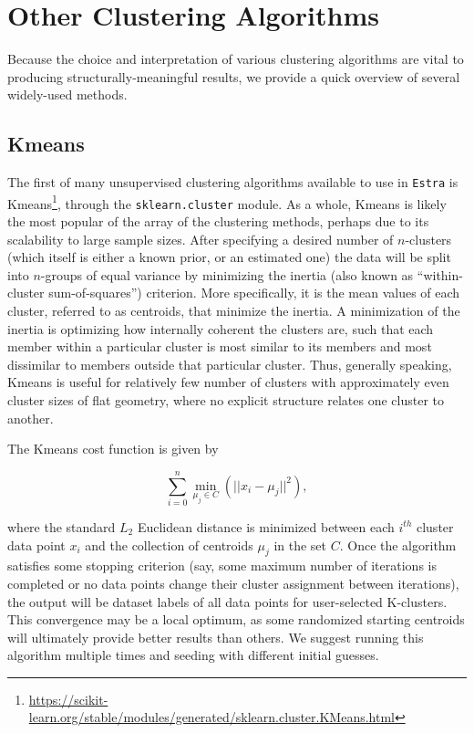 \documentclass[fleqn,usenatbib,useAMS]{mnras}
\begin{document}


\appendix

\section{Other Clustering Algorithms}

Because the choice and interpretation of various clustering algorithms are vital to producing structurally-meaningful results, we provide a quick overview of several widely-used methods.

\subsection{Kmeans}

The first of many unsupervised clustering algorithms available to use in \texttt{Estra} is Kmeans\footnote{\url{https://scikit-learn.org/stable/modules/generated/sklearn.cluster.KMeans.html}}, through the \texttt{sklearn.cluster} module. As a whole, Kmeans is likely the most popular of the array of the clustering methods, perhaps due to its scalability to large sample sizes. After specifying a desired number of $n$-clusters (which itself is either a known prior, or an estimated one) the data will be split into $n$-groups of equal variance by minimizing the inertia (also known as ``within-cluster sum-of-squares'') criterion. More specifically, it is the mean values of each cluster, referred to as centroids, that minimize the inertia. A minimization of the inertia is optimizing how internally coherent the clusters are, such that each member within a particular cluster is most similar to its members and most dissimilar to members outside that particular cluster. Thus, generally speaking, Kmeans is useful for relatively few number of clusters with approximately even cluster sizes of flat geometry, where no explicit structure relates one cluster to another. \par

The Kmeans cost function is given by

\begin{equation}
    \sum_{i=0}^{n} \min_{\mu_j \in C}(||x_i-\mu_j||^2),
\end{equation}

where the standard $L_2$ Euclidean distance is minimized between each $i^{th}$ cluster data point $x_i$ and the collection of centroids $\mu_j$ in the set $C$. Once the algorithm satisfies some stopping criterion (say, some maximum number of iterations is completed or no data points change their cluster assignment between iterations), the output will be dataset labels of all data points for user-selected K-clusters. This convergence may be a local optimum, as some randomized starting centroids will ultimately provide better results than others. We suggest running this algorithm multiple times and seeding with different initial guesses. \par
\end{document}
